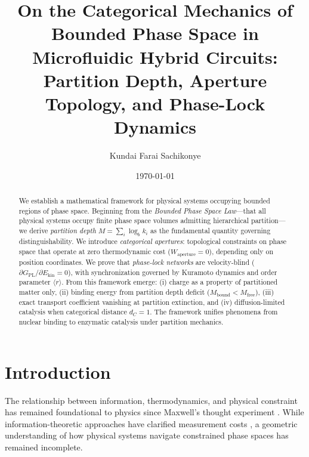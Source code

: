 \documentclass[twocolumn,amsmath,amssymb,aps,prl,superscriptaddress]{revtex4-2}
\newcommand{\Mpart}{M}
\newcommand{\Gfree}{G_{\text{PL}}}
\newcommand{\Ekin}{E_{\text{kin}}}
\newcommand{\Wapert}{W_{\text{aperture}}}
\newcommand{\orderp}{\langle r \rangle}
\begin{document}
\title{On the Categorical Mechanics of Bounded Phase Space in Microfluidic Hybrid Circuits: \\
Partition Depth, Aperture Topology, and Phase-Lock Dynamics}

\author{Kundai Farai Sachikonye}


\date{\today}

\begin{abstract}
We establish a mathematical framework for physical systems occupying bounded regions of phase space. Beginning from the \emph{Bounded Phase Space Law}---that all physical systems occupy finite phase space volumes admitting hierarchical partition---we derive \emph{partition depth} $\Mpart = \sum_i \log_b k_i$ as the fundamental quantity governing distinguishability. We introduce \emph{categorical apertures}: topological constraints on phase space that operate at zero thermodynamic cost ($\Wapert = 0$), depending only on position coordinates. We prove that \emph{phase-lock networks} are velocity-blind ($\partial \Gfree / \partial \Ekin = 0$), with synchronization governed by Kuramoto dynamics and order parameter $\orderp$. From this framework emerge: (i) charge as a property of partitioned matter only, (ii) binding energy from partition depth deficit ($\Mpart_{\text{bound}} < \Mpart_{\text{free}}$), (iii) exact transport coefficient vanishing at partition extinction, and (iv) diffusion-limited catalysis when categorical distance $d_C = 1$. The framework unifies phenomena from nuclear binding to enzymatic catalysis under partition mechanics.
\end{abstract}

\maketitle

\section{Introduction}

The relationship between information, thermodynamics, and physical constraint has remained foundational to physics since Maxwell's thought experiment \cite{maxwell1871theory}. While information-theoretic approaches have clarified measurement costs \cite{landauer1961irreversibility,bennett1982thermodynamics}, a geometric understanding of how physical systems navigate constrained phase spaces has remained incomplete.
\end{document}
